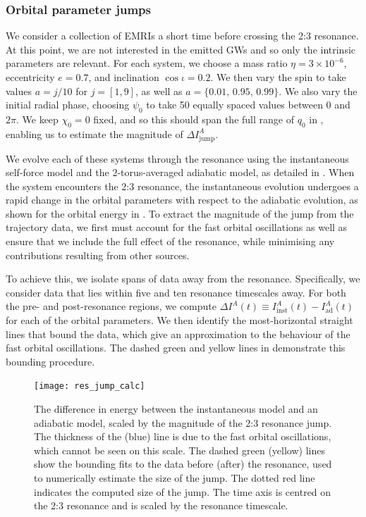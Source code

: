 \subsubsection{Orbital parameter jumps}
\label{sec:res-orb-jumps}
We consider a collection of EMRIs a short time before crossing the 2:3 resonance. At this point, we are not interested in the emitted GWs and so only the intrinsic parameters are relevant. For each system, we choose a mass ratio $\eta = 3\times 10^{-6}$, eccentricity $e=0.7$, and inclination $\cos\iota = 0.2$. We then vary the spin to take values $a = j/10$ for $j=[1,9]$, as well as $a = \{0.01,\,0.95,\,0.99\}$. We also vary the initial radial phase, choosing $\psi_0$ to take 50 equally spaced values between $0$ and $2\pi$. We keep $\chi_0 = 0$ fixed, and so this should span the full range of $q_0$ in , enabling us to estimate the magnitude of $\Delta I^A_\mathrm{jump}$.

We evolve each of these systems through the resonance using the instantaneous self-force model and the 2-torus-averaged adiabatic model, as detailed in . When the system encounters the 2:3 resonance, the instantaneous evolution undergoes a rapid change in the orbital parameters with respect to the adiabatic evolution, as shown for the orbital energy in . To extract the magnitude of the jump from the trajectory data, we first must account for the fast orbital oscillations as well as ensure that we include the full effect of the resonance, while minimising any contributions resulting from other sources.

To achieve this, we isolate spans of data away from the resonance. Specifically, we consider data that lies within five and ten resonance timescales away. For both the pre- and post-resonance regions, we compute $\Delta I^A(t) \equiv I^A_{\mathrm{inst}}(t) - I^A_\mathrm{ad}(t)$ for each of the orbital parameters. We then identify the most-horizontal straight lines that bound the data, which give an approximation to the behaviour of the fast orbital oscillations. The dashed green and yellow lines in  demonstrate this bounding procedure.

\begin{figure}[htbp]
\centering
\texttt{[image: res\_jump\_calc]}
\caption{\label{fig:res-jump-calc}The difference in energy between the instantaneous model and an adiabatic model, scaled by the magnitude of the 2:3 resonance jump. The thickness of the (blue) line is due to the fast orbital oscillations, which cannot be seen on this scale. The dashed green (yellow) lines show the bounding fits to the data before (after) the resonance, used to numerically estimate the size of the jump. The dotted red line indicates the computed size of the jump. The time axis is centred on the 2:3 resonance and is scaled by the resonance timescale.}
\end{figure}

